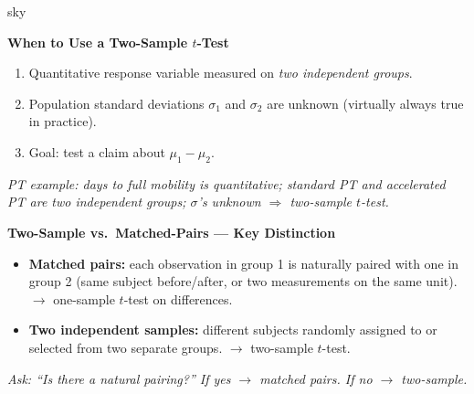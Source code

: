 \documentclass[10pt]{article}
\begin{document}
\begin{skillbox}{sky}
\begin{minipage}[t]{0.48\linewidth}
    \textbf{When to Use a Two-Sample $t$-Test}
    \begin{enumerate}
        \item Quantitative response variable measured on \emph{two independent groups}.
        \item Population standard deviations $\sigma_1$ and $\sigma_2$ are unknown
              (virtually always true in practice).
        \item Goal: test a claim about $\mu_1 - \mu_2$.
    \end{enumerate}
    \textit{PT example: days to full mobility is quantitative; standard PT and accelerated PT
    are two independent groups; $\sigma$'s unknown $\Rightarrow$ two-sample $t$-test.}
\end{minipage}
\hfill
\begin{minipage}[t]{0.48\linewidth}
    \textbf{Two-Sample vs.\ Matched-Pairs --- Key Distinction}
    \begin{itemize}
        \item \textbf{Matched pairs:} each observation in group 1 is naturally paired
              with one in group 2 (same subject before/after, or two measurements on
              the same unit). $\to$ one-sample $t$-test on differences.
        \item \textbf{Two independent samples:} different subjects randomly assigned
              to or selected from two separate groups. $\to$ two-sample $t$-test.
    \end{itemize}
    \textit{Ask: ``Is there a natural pairing?'' If yes $\to$ matched pairs. If no $\to$
    two-sample.}
\end{minipage}
\end{skillbox}
\end{document}
